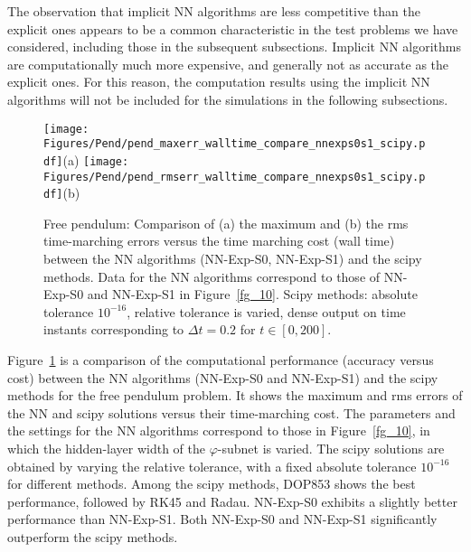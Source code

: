 The observation that implicit NN algorithms are less competitive than the explicit ones
appears to be a common characteristic in the test problems we have considered, including
those in the subsequent subsections. Implicit NN algorithms
are computationally much more expensive, and
generally not as accurate as the explicit ones.
For this reason, the computation results using the implicit NN algorithms
will not be included for the simulations in the following subsections.


\begin{figure}
  \centerline{
    \texttt{[image: Figures/Pend/pend\_maxerr\_walltime\_compare\_nnexps0s1\_scipy.pdf]}(a)
    \texttt{[image: Figures/Pend/pend\_rmserr\_walltime\_compare\_nnexps0s1\_scipy.pdf]}(b)
  }
  \caption{Free pendulum:
    Comparison of (a) the maximum and (b) the rms time-marching errors versus the time marching
    cost (wall time) between the NN algorithms
    (NN-Exp-S0, NN-Exp-S1) and the scipy methods.
    Data for the NN algorithms correspond to
    those of NN-Exp-S0 and NN-Exp-S1 in Figure~\ref{fg_10}.
    Scipy methods: absolute tolerance $10^{-16}$, relative tolerance is varied,
    dense output on time instants
    corresponding to $\Delta t=0.2$ for $t\in[0,200]$.
  }
  \label{fg_11}
\end{figure}

Figure~\ref{fg_11} is a comparison of the computational performance
(accuracy versus cost) between the
NN algorithms (NN-Exp-S0 and NN-Exp-S1) and the scipy methods for the free pendulum
problem. It shows the maximum and rms errors of the NN and scipy solutions
versus their time-marching cost. The parameters and the settings for
the NN algorithms correspond to those in Figure~\ref{fg_10}, in which
the hidden-layer width of the $\varphi$-subnet is varied.
The scipy solutions are obtained by varying the relative tolerance, with
a fixed absolute tolerance $10^{-16}$ for different methods.
Among the scipy methods, DOP853 shows the best performance,
followed by RK45 and Radau. NN-Exp-S0 exhibits a slightly better performance than NN-Exp-S1.
Both NN-Exp-S0 and
NN-Exp-S1 significantly outperform the scipy methods. 



